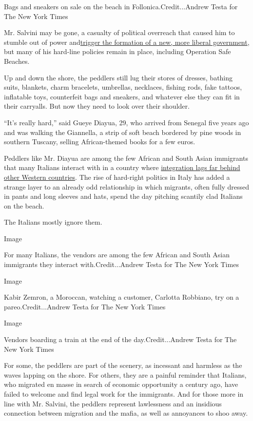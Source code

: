 Bags and sneakers on sale on the beach in Follonica.Credit...Andrew
Testa for The New York Times

Mr. Salvini may be gone, a casualty of political overreach that caused
him to stumble out of power
and\href{https://www.nytimes3xbfgragh.onion/2019/08/28/world/europe/italy-government-salvini.html}{trigger
the formation of a new, more liberal government}, but many of his
hard-line policies remain in place, including Operation Safe Beaches.

Up and down the shore, the peddlers still lug their stores of dresses,
bathing suits, blankets, charm bracelets, umbrellas, necklaces, fishing
rods, fake tattoos, inflatable toys, counterfeit bags and sneakers, and
whatever else they can fit in their carryalls. But now they need to look
over their shoulder.

``It's really hard,'' said Gueye Diayua, 29, who arrived from Senegal
five years ago and was walking the Giannella, a strip of soft beach
bordered by pine woods in southern Tuscany, selling African-themed books
for a few euros.

Peddlers like Mr. Diayua are among the few African and South Asian
immigrants that many Italians interact with in a country where
\href{https://www.nytimes3xbfgragh.onion/2018/02/20/world/europe/italy-tuscany-migration-elections.html}{integration
lags far behind other Western countries}. The rise of hard-right
politics in Italy has added a strange layer to an already odd
relationship in which migrants, often fully dressed in pants and long
sleeves and hats, spend the day pitching scantily clad Italians on the
beach.

The Italians mostly ignore them.

Image

For many Italians, the vendors are among the few African and South Asian
immigrants they interact with.Credit...Andrew Testa for The New York
Times

Image

Kabir Zemron, a Moroccan, watching a customer, Carlotta Robbiano, try on
a pareo.Credit...Andrew Testa for The New York Times

Image

Vendors boarding a train at the end of the day.Credit...Andrew Testa for
The New York Times

For some, the peddlers are part of the scenery, as incessant and
harmless as the waves lapping on the shore. For others, they are a
painful reminder that Italians, who migrated en masse in search of
economic opportunity a century ago, have failed to welcome and find
legal work for the immigrants. And for those more in line with Mr.
Salvini, the peddlers represent lawlessness and an insidious connection
between migration and the mafia, as well as annoyances to shoo away.

